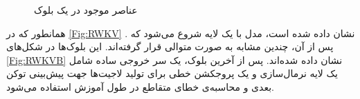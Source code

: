 \begin{figure}%
      \centering
      \qquad
      \caption{عناصر موجود در یک بلوک }
      \label{fig:example}%
\end{figure}

همانطور که در \ref{Fig:RWKV} نشان داده شده است،
مدل با یک لایه  شروع می‌شود که  . پس از آن، چندین   مشابه به صورت متوالی قرار گرفته‌اند. این بلوک‌ها در شکل‌های \ref{Fig:RWKVB} نشان داده شده‌اند. پس از آخرین بلوک، یک سر خروجی ساده شامل یک لایه نرمال‌سازی  و یک پروجکشن خطی برای تولید لاجیت‌ها  جهت پیش‌بینی توکن بعدی و محاسبه‌ی خطای متقاطع  در طول آموزش استفاده می‌شود.

